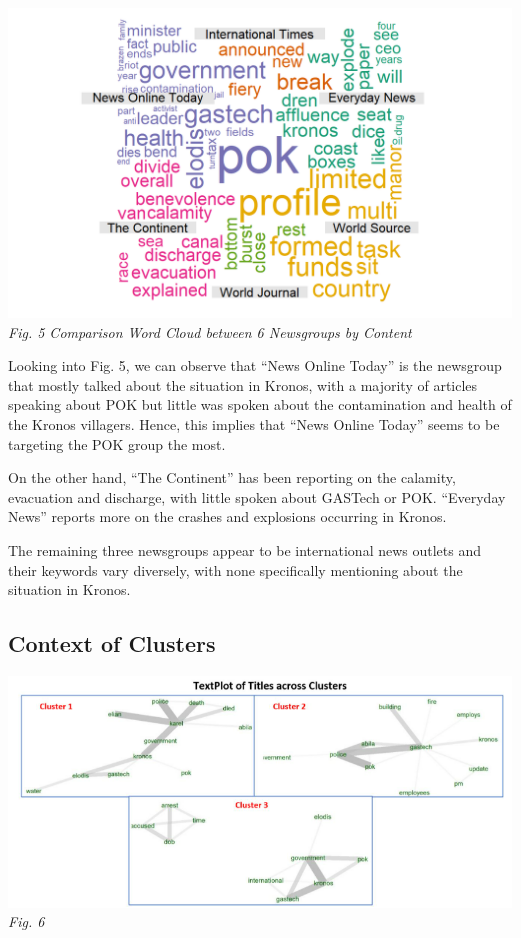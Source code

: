 \documentclass{acm_proc_article-sp}
\begin{document}
\includegraphics{img/image03.png} \emph{Fig. 5 Comparison Word Cloud
between 6 Newsgroups by Content}

Looking into Fig. 5, we can observe that ``News Online Today'' is the
newsgroup that mostly talked about the situation in Kronos, with a
majority of articles speaking about POK but little was spoken about the
contamination and health of the Kronos villagers. Hence, this implies
that ``News Online Today'' seems to be targeting the POK group the most.

On the other hand, ``The Continent'' has been reporting on the calamity,
evacuation and discharge, with little spoken about GASTech or POK.
``Everyday News'' reports more on the crashes and explosions occurring
in Kronos.

The remaining three newsgroups appear to be international news outlets
and their keywords vary diversely, with none specifically mentioning
about the situation in Kronos.

\hypertarget{context-of-clusters}{%
\subsection{Context of Clusters}\label{context-of-clusters}}

\includegraphics{img/image12.png} \emph{Fig. 6}
\end{document}
